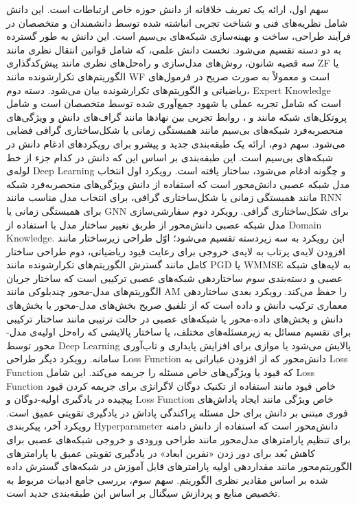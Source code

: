 سهم اول، ارائه یک تعریف خلاقانه از دانش حوزه خاص ارتباطات است. این دانش شامل نظریه‌های فنی و شناخت تجربی انباشته شده توسط دانشمندان و متخصصان در فرآیند طراحی، ساخت و بهینه‌سازی شبکه‌های بی‌سیم است. این دانش به طور گسترده به دو دسته تقسیم می‌شود. نخست دانش علمی، که شامل قوانین انتقال نظری مانند سه قضیه شانون، ‌روش‌های مدل‌سازی و راه‌حل‌های نظری مانند پیش‌کدگذاری 
\gls{ZF}
یا الگوریتم‌های تکرارشونده مانند 
\gls{WF}
 است و معمولاً به صورت صریح در فرمول‌های ریاضیاتی و الگوریتم‌های تکرارشونده بیان می‌شود. دسته دوم، 
\gls{Expert Knowledge}
  است که شامل تجربه عملی یا شهود جمع‌آوری شده توسط متخصصان است و شامل پروتکل‌های شبکه مانند 
   و 
،
    روابط تجربی بین نهادها مانند گراف‌های دانش و ویژگی‌های منحصربه‌فرد شبکه‌های بی‌سیم مانند همبستگی زمانی یا شکل‌ساختاری گرافی فضایی می‌شود.
سهم دوم، ارائه یک طبقه‌بندی جدید و پیشرو برای رویکردهای ادغام دانش در شبکه‌های بی‌سیم است. این طبقه‌بندی بر اساس این که دانش در کدام جزء از خط لوله‌ی 
\gls{Deep Learning}
 و چگونه ادغام می‌شود، ساختار یافته است. رویکرد اول انتخاب مدل شبکه عصبی دانش‌محور است که استفاده از دانش ویژگی‌های منحصربه‌فرد شبکه مانند همبستگی زمانی یا شکل‌ساختاری گرافی، برای انتخاب مدل مناسب مانند 
\gls{RNN}
  برای همبستگی زمانی یا 
\gls{GNN}
   برای شکل‌ساختاری گرافی.
رویکرد دوم سفارشی‌سازی مدل شبکه عصبی دانش‌محور از طربق تغییر ساختار مدل با استفاده از 
\gls{Domain Knowledge}.
 این رویکرد به سه زیردسته تقسیم می‌شود؛ اوّل طراحی زیرساختار مانند افزودن لایه‌ی پرتاب به لایه‌ی خروجی برای رعایت قیود ریاضیاتی، دوم طراحی ساختار کامل مانند گسترش الگوریتم‌های تکرارشونده مانند 
\gls{PGD}
  یا 
\gls{WMMSE}
   به لایه‌های شبکه عصبی و دسته‌بندی سوم ساختاردهی شبکه‌های عصبی ترکیبی است که ساختار جریان الگوریتم‌های مدل-محور چندبلوکی مانند 
\gls{AM}
    را حفظ می‌کند.
رویکرد بعدی ساختاردهی معماری ترکیب دانش و داده است که از تلفیق صریح بخش‌های مدل-محور یا بخش‌های دانش و بخش‌های داده-محور یا شبکه‌های عصبی در حالت ترتیبی مانند ساختار ترکیبی برای تقسیم مسائل به زیرمسئله‌های مختلف، یا ساختار پالایشی که راه‌حل اولیه‌ی مدل-محور توسط 
\gls{Deep Learning}
 پالایش می‌شود یا موازی برای افزایش پایداری و تاب‌آوری سامانه.
رویکرد دیگر طراحی 
\gls{Loss Function}
دانش‌محور که از افزودن عباراتی به 
\gls{Loss Function}
 که قیود یا ویژگی‌های خاص مسئله را جریمه می‌کند. این شامل 
\gls{Loss Function}
 خاص قیود مانند استفاده از تکنیک دوگان لاگرانژی برای جریمه کردن قیود پیچیده در یادگیری اولیه-دوگان و 
\gls{Loss Function}
 خاص ویژگی مانند ایجاد پاداش‌های فوری مبتنی بر دانش برای حل مسئله پراکندگی پاداش در  یادگیری تقویتی عمیق است.
رویکرد آخر، پیکربندی 
\gls{Hyperparameter}
 دانش‌محور است که استفاده از دانش دامنه برای تنظیم پارامترهای مدل‌محور مانند طراحی ورودی و خروجی شبکه‌های عصبی برای کاهش بُعد برای دور زدن «نفرین ابعاد» در یادگیری تقویتی عمیق یا پارامترهای الگوریتم‌محور مانند مقداردهی اولیه پارامترهای قابل آموزش در شبکه‌های گسترش داده شده بر اساس مقادیر نظری الگوریتم.
سهم سوم، بررسی جامع ادبیات مربوط به تخصیص منابع و پردازش سیگنال بر اساس این طبقه‌بندی جدید است.

